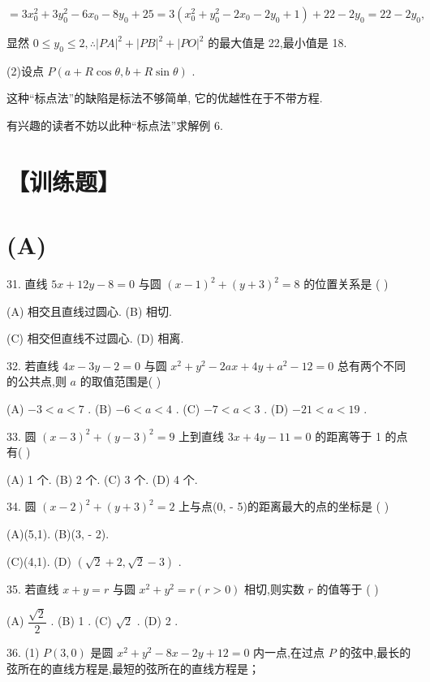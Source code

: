 $= 3{x}_{0}^{2} + 3{y}_{0}^{2} - 6{x}_{0} - 8{y}_{0} + {25} = 3\left( {{x}_{0}^{2} + {y}_{0}^{2} - 2{x}_{0} - 2{y}_{0} + 1}\right)  + {22} - 2{y}_{0} = {22} - 2{y}_{0},$

显然 $0 \leq  {y}_{0} \leq  2,\therefore {\left| PA\right| }^{2} + {\left| PB\right| }^{2} + {\left| PO\right| }^{2}$ 的最大值是 22,最小值是 18.

(2)设点 $P\left( {a + R\cos \theta ,b + R\sin \theta }\right)$ .

这种“标点法”的缺陷是标法不够简单, 它的优越性在于不带方程.

有兴趣的读者不妨以此种“标点法”求解例 6.

\section*{【训练题】}

\section*{(A)}

31. 直线 ${5x} + {12y} - 8 = 0$ 与圆 ${\left( x - 1\right) }^{2} + {\left( y + 3\right) }^{2} = 8$ 的位置关系是 (   )

(A) 相交且直线过圆心. (B) 相切.

(C) 相交但直线不过圆心. (D) 相离.

32. 若直线 ${4x} - {3y} - 2 = 0$ 与圆 ${x}^{2} + {y}^{2} - {2ax} + {4y} + {a}^{2} - {12} = 0$ 总有两个不同的公共点,则 $a$ 的取值范围是(   )

(A) $- 3 < a < 7$ . (B) $- 6 < a < 4$ . (C) $- 7 < a < 3$ . (D) $- {21} < a < {19}$ .

33. 圆 ${\left( x - 3\right) }^{2} + {\left( y - 3\right) }^{2} = 9$ 上到直线 ${3x} + {4y} - {11} = 0$ 的距离等于 1 的点有(   )

(A) 1 个. (B) 2 个. (C) 3 个. (D) 4 个.

34. 圆 ${\left( x - 2\right) }^{2} + {\left( y + 3\right) }^{2} = 2$ 上与点(0, - 5)的距离最大的点的坐标是 (   )

(A)(5,1). (B)(3, - 2).

(C)(4,1). (D) $\left( {\sqrt{2} + 2,\sqrt{2} - 3}\right)$ .

35. 若直线 $x + y = r$ 与圆 ${x}^{2} + {y}^{2} = r\left( {r > 0}\right)$ 相切,则实数 $r$ 的值等于 (   )

(A) $\dfrac{\sqrt{2}}{2}$ . (B) 1 . (C) $\sqrt{2}$ . (D) 2 .

36. (1) $P\left( {3,0}\right)$ 是圆 ${x}^{2} + {y}^{2} - {8x} - {2y} + {12} = 0$ 内一点,在过点 $P$ 的弦中,最长的弦所在的直线方程是\blkda{},最短的弦所在的直线方程是\blkda{}；

